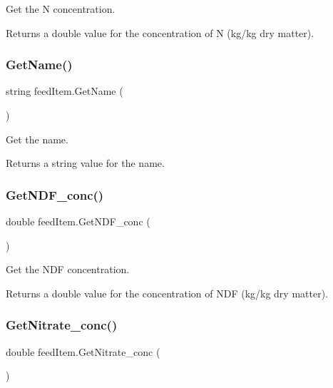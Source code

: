 Get the N concentration. 

\begin{DoxyReturn}{Returns}
a double value for the concentration of N (kg/kg dry matter). 
\end{DoxyReturn}
\mbox{\label{classfeed_item_a16577e5c3903fae1efc1449bbe7e33b9}} 
\subsubsection{\texorpdfstring{GetName()}{GetName()}}
{\footnotesize\ttfamily string feed\+Item.\+Get\+Name (\begin{DoxyParamCaption}{ }\end{DoxyParamCaption})\hspace{0.3cm}{\ttfamily [inline]}}



Get the name. 

\begin{DoxyReturn}{Returns}
a string value for the name. 
\end{DoxyReturn}
\mbox{\label{classfeed_item_a389c3dfb020e459f46d0b0050898fa5d}} 
\subsubsection{\texorpdfstring{GetNDF\_conc()}{GetNDF\_conc()}}
{\footnotesize\ttfamily double feed\+Item.\+Get\+N\+D\+F\+\_\+conc (\begin{DoxyParamCaption}{ }\end{DoxyParamCaption})\hspace{0.3cm}{\ttfamily [inline]}}



Get the N\+DF concentration. 

\begin{DoxyReturn}{Returns}
a double value for the concentration of N\+DF (kg/kg dry matter). 
\end{DoxyReturn}
\mbox{\label{classfeed_item_a085b65e8acfd2244163a28feb7374491}} 
\subsubsection{\texorpdfstring{GetNitrate\_conc()}{GetNitrate\_conc()}}
{\footnotesize\ttfamily double feed\+Item.\+Get\+Nitrate\+\_\+conc (\begin{DoxyParamCaption}{ }\end{DoxyParamCaption})\hspace{0.3cm}{\ttfamily [inline]}}



